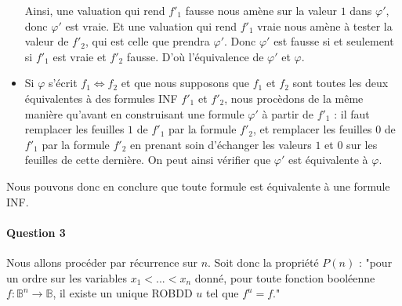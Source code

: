 \documentclass[a4paper,11pt]{article}
\begin{document}
\begin{itemize}
		Ainsi, une valuation qui rend ${f'}_1$ fausse nous amène sur la valeur $1$ dans $\varphi'$, donc $\varphi'$ est vraie. Et une valuation qui rend ${f'}_1$ vraie nous amène à tester la valeur de ${f'}_2$, qui est celle que prendra $\varphi'$. Donc $\varphi'$ est fausse si et seulement si ${f'}_1$ est vraie et ${f'}_2$ fausse. D'où l'équivalence de $\varphi'$ et $\varphi$.
		\item Si $\varphi$ s'écrit $f_1 \Leftrightarrow f_2$ et que nous supposons que $f_1$ et $f_2$ sont toutes les deux équivalentes à des formules INF ${f'}_1$ et ${f'}_2$, nous procèdons de la même manière qu'avant en construisant une formule $\varphi'$ à partir de ${f'}_1$ : il faut remplacer les feuilles $1$ de ${f'}_1$ par la formule ${f'}_2$, et remplacer les feuilles $0$ de ${f'}_1$ par la formule ${f'}_2$ en prenant soin d'échanger les valeurs $1$ et $0$ sur les feuilles de cette dernière.
		On peut ainsi vérifier que $\varphi'$ est équivalente à $\varphi$.
 		\end{itemize}

Nous pouvons donc en conclure que toute formule est équivalente à une formule INF.
	
		\paragraph{Question 3} Nous allons procéder par récurrence sur $n$.
		Soit donc la propriété $P(n)$ : "pour un ordre sur les variables $x_1 < ... < x_n$ donné, pour toute fonction booléenne $f : \mathbb{B}^n \rightarrow \mathbb{B}$, il existe un unique ROBDD $u$ tel que $f^u = f$."
		
\end{document}
